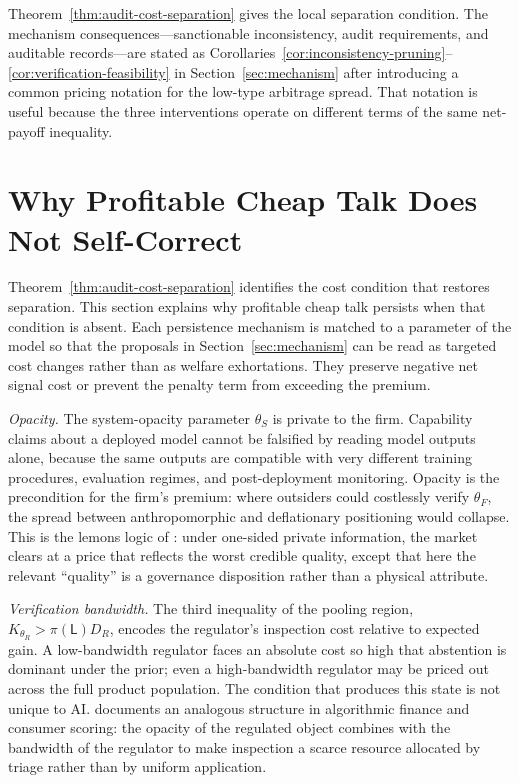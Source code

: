 \documentclass[review,authoryear]{elsarticle}
\theoremstyle{definition}
\theoremstyle{plain}
\begin{document}
Theorem~\ref{thm:audit-cost-separation} gives the local separation condition.
The mechanism consequences---sanctionable inconsistency, audit requirements,
and auditable records---are stated as
Corollaries~\ref{cor:inconsistency-pruning}--\ref{cor:verification-feasibility}
in Section~\ref{sec:mechanism} after introducing a common pricing notation for
the low-type arbitrage spread.  That notation is useful because the three
interventions operate on different terms of the same net-payoff inequality.

\section{Why Profitable Cheap Talk Does Not Self-Correct}
\label{sec:persistence}

Theorem~\ref{thm:audit-cost-separation} identifies the cost condition that restores separation.  This section explains why profitable cheap talk persists when that condition is absent.  Each persistence mechanism is matched to a parameter of the model so that the proposals in Section~\ref{sec:mechanism} can be read as targeted cost changes rather than as welfare exhortations. They preserve negative net signal cost or prevent the penalty term from exceeding the premium.

\emph{Opacity.} The system-opacity parameter $\theta_S$ is private to the firm. Capability claims about a deployed model cannot be falsified by reading model outputs alone, because the same outputs are compatible with very different training procedures, evaluation regimes, and post-deployment monitoring. Opacity is the precondition for the firm's premium: where outsiders could costlessly verify $\theta_F$, the spread between anthropomorphic and deflationary positioning would collapse. This is the lemons logic of \citet{akerlof1970}: under one-sided private information, the market clears at a price that reflects the worst credible quality, except that here the relevant ``quality'' is a governance disposition rather than a physical attribute.

\emph{Verification bandwidth.} The third inequality of the pooling region, $K_{\theta_R}>\pi(\mathsf{L})D_R$, encodes the regulator's inspection cost relative to expected gain. A low-bandwidth regulator faces an absolute cost so high that abstention is dominant under the prior; even a high-bandwidth regulator may be priced out across the full product population. The condition that produces this state is not unique to AI. \citet{pasquale2015} documents an analogous structure in algorithmic finance and consumer scoring: the opacity of the regulated object combines with the bandwidth of the regulator to make inspection a scarce resource allocated by triage rather than by uniform application.
\end{document}
